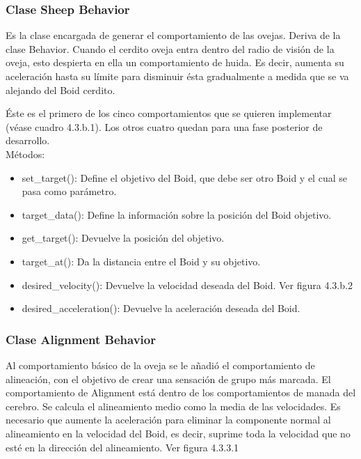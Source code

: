 \subsubsection{Clase Sheep Behavior}
\label{subsubsection:sheep_behavior}
 

Es la clase encargada de generar el comportamiento de las ovejas. Deriva de la clase Behavior. Cuando el cerdito oveja entra dentro del 
radio de visión de la oveja, esto despierta en ella un comportamiento de huida. Es decir, aumenta su aceleración hasta su límite para 
disminuir ésta gradualmente a medida que se va alejando del Boid cerdito.

Éste es el primero de los cinco comportamientos que se quieren implementar (véase cuadro 4.3.b.1). Los otros cuatro quedan para una fase 
posterior de desarrollo.\\

Métodos:
\begin{itemize}
\item set\_target():
Define el objetivo del Boid, que debe ser otro Boid y el cual se pasa como parámetro.

\item target\_data():
Define la información sobre la posición del Boid objetivo.

\item get\_target():
Devuelve la posición del objetivo.

\item target\_at():
Da la distancia entre el Boid y su objetivo.

\item desired\_velocity():
Devuelve la velocidad deseada del Boid. Ver figura 4.3.b.2

\item desired\_acceleration():
Devuelve la aceleración deseada del Boid.
\end{itemize}

\subsubsection{Clase Alignment Behavior}
\label{subsubsection:alignment_behavior}

Al comportamiento básico de la oveja se le añadió el comportamiento de alineación, con el objetivo de crear una sensación de grupo más 
marcada. El comportamiento de Alignment está dentro de los comportamientos de manada del cerebro.
Se calcula el alineamiento medio como la media de las velocidades. Es necesario que aumente la aceleración para eliminar la componente 
normal al alineamiento en la velocidad del Boid, es decir, suprime toda la velocidad que no esté en la dirección del alineamiento. Ver figura 4.3.3.1\\

